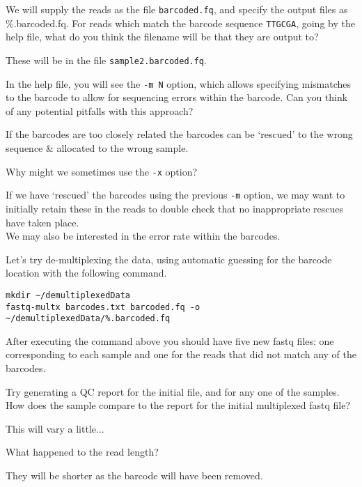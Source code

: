 \begin{questions}
We will supply the reads as the file \texttt{barcoded.fq}, and specify the output files as \%.barcoded.fq.
For reads which match the barcode sequence \texttt{TTGCGA}, going by the help file, what do you think the filename will be that they are output to? \\
\begin{answer}
These will be in the file \texttt{sample2.barcoded.fq}.\\
\end{answer}
In the help file, you will see the \texttt{-m N} option, which allows specifying mismatches to the barcode to allow for sequencing errors within the barcode.
Can you think of any potential pitfalls with this approach? \\
\begin{answer}
If the barcodes are too closely related the barcodes can be `rescued' to the wrong sequence \& allocated to the wrong sample. \\
\end{answer}
Why might we sometimes use the \texttt{-x} option? \\ 
\begin{answer}
If we have `rescued' the barcodes using the previous \texttt{-m} option, we may want to initially retain these in the reads to double check that no inappropriate rescues have taken place.\\
We may also be interested in the error rate within the barcodes.\\
\end{answer}
\end{questions}

\begin{steps}
Let's try de-multiplexing the data, using automatic guessing for the barcode location with the following command.\\
\begin{lstlisting}
mkdir ~/demultiplexedData
fastq-multx barcodes.txt barcoded.fq -o ~/demultiplexedData/%.barcoded.fq
\end{lstlisting}
After executing the command above you should have five new fastq files: one corresponding to each sample and one for the reads that did not match any of the barcodes.
\end{steps}

\begin{questions}
Try generating a QC report for the initial file, and for any one of the samples. 
How does the sample compare to the report for the initial multiplexed fastq file? \\
\begin{answer}
This will vary a little...\\
\end{answer}
What happened to the read length? \\
\begin{answer}
They will be shorter as the barcode will have been removed.
\end{answer}
\end{questions}